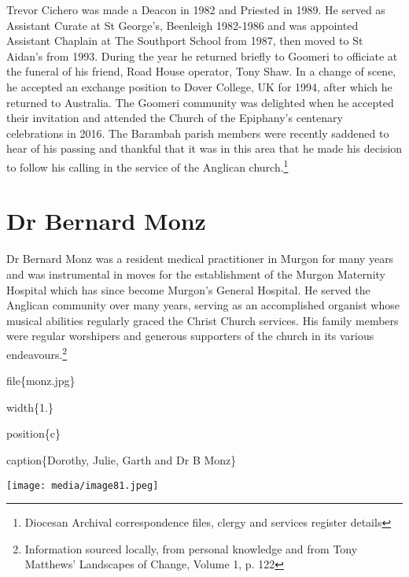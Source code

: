 Trevor Cichero was made a Deacon in 1982 and Priested in 1989. He served as Assistant Curate at St George's, Beenleigh 1982-1986 and was appointed Assistant Chaplain at The Southport School from 1987, then moved to St Aidan's from 1993. During the year he returned briefly to Goomeri to officiate at the funeral of his friend, Road House operator, Tony Shaw. In a change of scene, he accepted an exchange position to Dover College, UK for 1994, after which he returned to Australia. The Goomeri community was delighted when he accepted their invitation and attended the Church of the Epiphany's centenary celebrations in 2016. The Barambah parish members were recently saddened to hear of his passing and thankful that it was in this area that he made his decision to follow his calling in the service of the Anglican church.\footnote{Diocesan Archival correspondence files, clergy and services register details}

\hypertarget{dr-bernard-monz}{%
\section{Dr Bernard Monz}\label{dr-bernard-monz}}

Dr Bernard Monz was a resident medical practitioner in Murgon for many years and was instrumental in moves for the establishment of the Murgon Maternity Hospital which has since become Murgon's General Hospital. He served the Anglican community over many years, serving as an accomplished organist whose musical abilities regularly graced the Christ Church services. His family members were regular worshipers and generous supporters of the church in its various endeavours.\footnote{Information sourced locally, from personal knowledge and from Tony Matthews' Landscapes of Change, Volume 1, p. 122}

file\{monz.jpg\}

width\{1.\}

position\{c\}

caption\{Dorothy, Julie, Garth and Dr B Monz\}

\texttt{[image: media/image81.jpeg]}
